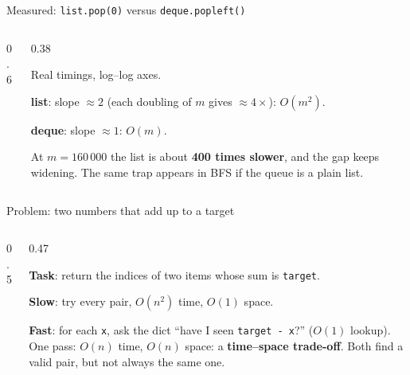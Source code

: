 \documentclass[aspectratio=169,10pt]{beamer}
\begin{document}
\begin{frame}{Measured: \texttt{list.pop(0)} versus \texttt{deque.popleft()}}
\begin{columns}[T]
\begin{column}{0.6\textwidth}
\begin{sfig}[0.7]
\end{sfig}
\end{column}
\begin{column}{0.38\textwidth}
{\small
Real timings, log--log axes.

\vspace{2mm}
\textbf{list}: slope $\approx2$ (each doubling of $m$ gives $\approx4\times$): $O(m^2)$.

\vspace{2mm}
\textbf{deque}: slope $\approx1$: $O(m)$.

\vspace{2mm}
At $m=160\,000$ the list is about \textbf{400 times slower}, and the gap keeps widening. The same trap appears in BFS if the queue is a plain list.}
\end{column}
\end{columns}
\end{frame}

\begin{frame}{Problem: two numbers that add up to a target}
\begin{columns}[T]
\begin{column}{0.5\textwidth}
\vspace{2mm}
\end{column}
\begin{column}{0.47\textwidth}
\vspace{2mm}
{\small
\textbf{Task}: return the indices of two items whose sum is \texttt{target}.

\vspace{1mm}
\textbf{Slow}: try every pair, $O(n^2)$ time, $O(1)$ space.

\vspace{1mm}
\textbf{Fast}: for each \texttt{x}, ask the dict ``have I seen \texttt{target - x}?'' ($O(1)$ lookup). One pass: $O(n)$ time, $O(n)$ space: a \textbf{time--space trade-off}. Both find a valid pair, but not always the same one.}
\end{column}
\end{columns}
\end{frame}
\end{document}
